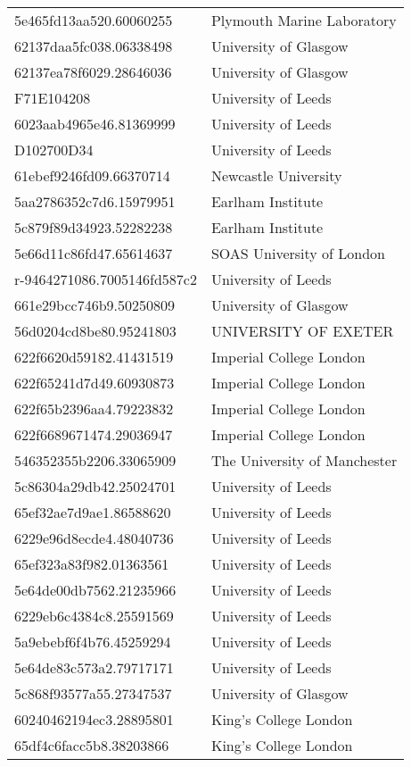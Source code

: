 \begin{tabular}{ll}
5e465fd13aa520.60060255 & Plymouth Marine Laboratory \\
62137daa5fc038.06338498 & University of Glasgow \\
62137ea78f6029.28646036 & University of Glasgow \\
F71E104208 & University of Leeds \\
6023aab4965e46.81369999 & University of Leeds \\
D102700D34 & University of Leeds \\
61ebef9246fd09.66370714 & Newcastle University \\
5aa2786352c7d6.15979951 & Earlham Institute \\
5c879f89d34923.52282238 & Earlham Institute \\
5e66d11c86fd47.65614637 & SOAS University of London \\
r-9464271086.7005146fd587c2 & University of Leeds \\
661e29bcc746b9.50250809 & University of Glasgow \\
56d0204cd8be80.95241803 & UNIVERSITY OF EXETER \\
622f6620d59182.41431519 & Imperial College London \\
622f65241d7d49.60930873 & Imperial College London \\
622f65b2396aa4.79223832 & Imperial College London \\
622f6689671474.29036947 & Imperial College London \\
546352355b2206.33065909 & The University of Manchester \\
5c86304a29db42.25024701 & University of Leeds \\
65ef32ae7d9ae1.86588620 & University of Leeds \\
6229e96d8ecde4.48040736 & University of Leeds \\
65ef323a83f982.01363561 & University of Leeds \\
5e64de00db7562.21235966 & University of Leeds \\
6229eb6c4384c8.25591569 & University of Leeds \\
5a9ebebf6f4b76.45259294 & University of Leeds \\
5e64de83c573a2.79717171 & University of Leeds \\
5c868f93577a55.27347537 & University of Glasgow \\
60240462194ec3.28895801 & King's College London \\
65df4c6facc5b8.38203866 & King's College London \\

\end{tabular}
